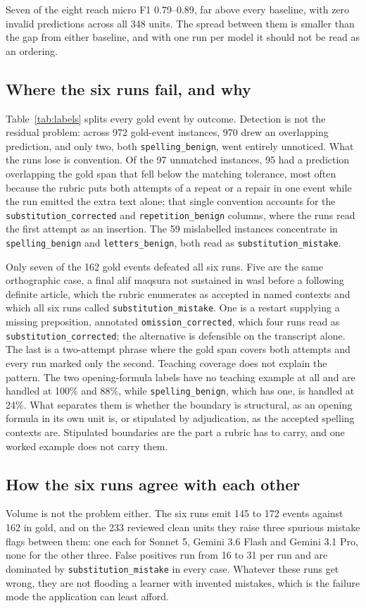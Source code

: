 \documentclass{article}
\begin{document}
Seven of the eight reach micro F1 0.79--0.89, far above every baseline, with zero invalid predictions across all 348 units. The spread between them is smaller than the gap from either baseline, and with one run per model it should not be read as an ordering.

\subsection*{Where the six runs fail, and why}
Table~\ref{tab:labels} splits every gold event by outcome. Detection is not the residual problem: across 972 gold-event instances, 970 drew an overlapping prediction, and only two, both \texttt{spelling\_benign}, went entirely unnoticed. What the runs lose is convention. Of the 97 unmatched instances, 95 had a prediction overlapping the gold span that fell below the matching tolerance, most often because the rubric puts both attempts of a repeat or a repair in one event while the run emitted the extra text alone; that single convention accounts for the \texttt{substitution\_corrected} and \texttt{repetition\_benign} columns, where the runs read the first attempt as an insertion. The 59 mislabelled instances concentrate in \texttt{spelling\_benign} and \texttt{letters\_benign}, both read as \texttt{substitution\_mistake}.

Only seven of the 162 gold events defeated all six runs. Five are the same orthographic case, a final alif maqsura not sustained in wasl before a following definite article, which the rubric enumerates as accepted in named contexts and which all six runs called \texttt{substitution\_mistake}. One is a restart supplying a missing preposition, annotated \texttt{omission\_corrected}, which four runs read as \texttt{substitution\_corrected}; the alternative is defensible on the transcript alone. The last is a two-attempt phrase where the gold span covers both attempts and every run marked only the second. Teaching coverage does not explain the pattern. The two opening-formula labels have no teaching example at all and are handled at 100\% and 88\%, while \texttt{spelling\_benign}, which has one, is handled at 24\%. What separates them is whether the boundary is structural, as an opening formula in its own unit is, or stipulated by adjudication, as the accepted spelling contexts are. Stipulated boundaries are the part a rubric has to carry, and one worked example does not carry them.

\subsection*{How the six runs agree with each other}
Volume is not the problem either. The six runs emit 145 to 172 events against 162 in gold, and on the 233 reviewed clean units they raise three spurious mistake flags between them: one each for Sonnet 5, Gemini 3.6 Flash and Gemini 3.1 Pro, none for the other three. False positives run from 16 to 31 per run and are dominated by \texttt{substitution\_mistake} in every case. Whatever these runs get wrong, they are not flooding a learner with invented mistakes, which is the failure mode the application can least afford.
\end{document}
